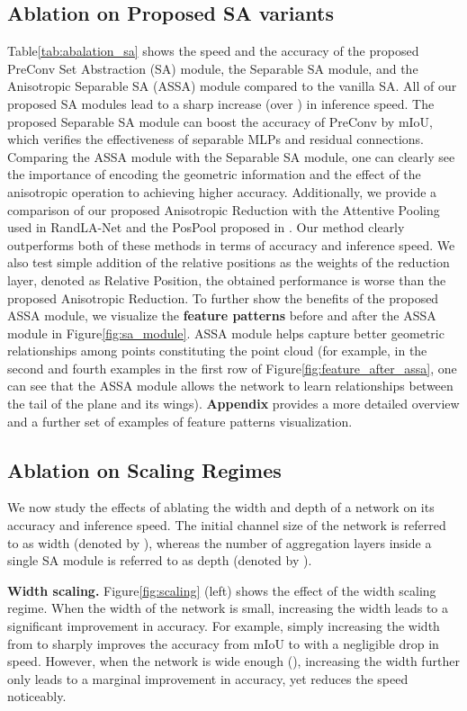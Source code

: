 \documentclass{article}
\newcommand{\figLabel}{Figure\xspace}
\newcommand{\tblLabel}{Table\xspace}
\newcommand{\mysection}[1]{\vspace{3pt}\noindent\textbf{#1.}}
\newcommand{\supp}{\textbf{Appendix}\xspace}
\begin{document}
\subsection{Ablation on Proposed SA variants}\label{sec:ablation_anisotropic} 
\tblLabel \ref{tab:abalation_sa} shows the speed and the accuracy of the proposed PreConv Set Abstraction (SA) module, the Separable SA module, and the Anisotropic Separable SA (ASSA) module compared to the vanilla SA. All of our proposed SA modules lead to a sharp increase (over ) in inference speed. The proposed Separable SA module can boost the accuracy of PreConv by  mIoU, which verifies the effectiveness of separable MLPs and residual connections. Comparing the ASSA module with the Separable SA module, one can clearly see the importance of encoding the geometric information and the effect of the anisotropic operation to achieving higher accuracy. Additionally, we provide a comparison of our proposed Anisotropic Reduction with the Attentive Pooling used in RandLA-Net \cite{Hu2020RandLANetES} and the PosPool proposed in \cite{Liu2020ACL}. Our method clearly outperforms both of these methods in terms of accuracy and inference speed. We also test simple addition of the relative positions  as the weights of the reduction layer, denoted as Relative Position, the obtained performance is worse than the proposed Anisotropic Reduction.
To further show the benefits of the proposed ASSA module, we visualize the \textbf{feature patterns} before and after the ASSA module in \figLabel \ref{fig:sa_module}. ASSA module helps capture better geometric relationships among points constituting the point cloud (for example, in the second and fourth examples in the first row of \figLabel \ref{fig:feature_after_assa}, one can see that the ASSA module allows the network to learn relationships between the tail of the plane and its wings). \supp provides a more detailed overview and a further set of examples of feature patterns visualization. 

\subsection{Ablation on Scaling  Regimes}\label{sec:ablation_scaling}
We now study the effects of ablating the width and depth of a network on its accuracy and inference speed. The initial channel size of the network is referred to as width (denoted by ), whereas the number of aggregation layers inside a single SA module is referred to as depth (denoted by ). 

\mysection{Width scaling} \figLabel \ref{fig:scaling} (left) shows the effect of the width scaling regime. When the width of the network is small, increasing the width leads to a significant improvement in accuracy. For example, simply increasing the width  from  to  sharply improves the accuracy from  mIoU to  with a negligible drop in speed. However, when the network is wide enough (), increasing the width further only leads to a marginal improvement in accuracy, yet reduces the speed noticeably.
\end{document}
